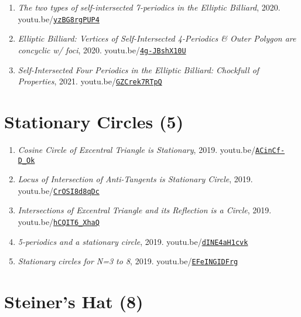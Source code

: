 \documentclass[12pt]{article}
\begin{document}
\begin{enumerate}[resume]
\item \textit{The two types of self-intersected 7-periodics in the Elliptic Billiard}, 2020. youtu.be/\href{https://youtu.be/yzBG8rgPUP4}{\nolinkurl{yzBG8rgPUP4}}
\item \textit{Elliptic Billiard: Vertices of Self-Intersected 4-Periodics \& Outer Polygon are concyclic w/ foci}, 2020. youtu.be/\href{https://youtu.be/4g-JBshX10U}{\nolinkurl{4g-JBshX10U}}
\item \textit{Self-Intersected Four Periodics in the Elliptic Billiard: Chockfull of Properties}, 2021. youtu.be/\href{https://youtu.be/GZCrek7RTpQ}{\nolinkurl{GZCrek7RTpQ}}
\end{enumerate}

\section{Stationary Circles (5)}

\begin{enumerate}[resume]
\item \textit{Cosine Circle of Excentral Triangle is Stationary}, 2019. youtu.be/\href{https://youtu.be/ACinCf-D_Ok}{\nolinkurl{ACinCf-D\_Ok}}
\item \textit{Locus of Intersection of Anti-Tangents is Stationary Circle}, 2019. youtu.be/\href{https://youtu.be/CrOSI8d8qDc}{\nolinkurl{CrOSI8d8qDc}}
\item \textit{Intersections of Excentral Triangle and its Reflection is a Circle}, 2019. youtu.be/\href{https://youtu.be/hCQIT6_XhaQ}{\nolinkurl{hCQIT6\_XhaQ}}
\item \textit{5-periodics and a stationary circle}, 2019. youtu.be/\href{https://youtu.be/dINE4aH1cvk}{\nolinkurl{dINE4aH1cvk}}
\item \textit{Stationary circles for N=3 to 8}, 2019. youtu.be/\href{https://youtu.be/EFeINGIDFrg}{\nolinkurl{EFeINGIDFrg}}
\end{enumerate}

\section{Steiner's Hat (8)}
\end{document}
